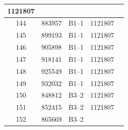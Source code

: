 \documentclass[UTF8,10pt,a4paper,fontset=fandol]{ctexart}
\newcommand{\fieldvalue}[1]{#1}
\begin{document}
\begin{center}
\begin{tabular}{|c|c|c|c|p{3.5cm}|}
\fieldvalue{1121807} & \\ \hline
144 &
\fieldvalue{883957} &
\fieldvalue{B1--1} &
\fieldvalue{1121807} & \\ \hline
145 &
\fieldvalue{899193} &
\fieldvalue{B1--1} &
\fieldvalue{1121807} & \\ \hline
146 &
\fieldvalue{905898} &
\fieldvalue{B1--1} &
\fieldvalue{1121807} & \\ \hline
147 &
\fieldvalue{918141} &
\fieldvalue{B1--1} &
\fieldvalue{1121807} & \\ \hline
148 &
\fieldvalue{925549} &
\fieldvalue{B1--1} &
\fieldvalue{1121807} & \\ \hline
149 &
\fieldvalue{932032} &
\fieldvalue{B1--1} &
\fieldvalue{1121807} & \\ \hline
150 &
\fieldvalue{848812} &
\fieldvalue{B3--2} &
\fieldvalue{1121807} & \\ \hline
151 &
\fieldvalue{852415} &
\fieldvalue{B3--2} &
\fieldvalue{1121807} & \\ \hline
152 &
\fieldvalue{865669} &
\fieldvalue{B3--2} &

\end{tabular}
\end{center}
\end{document}
